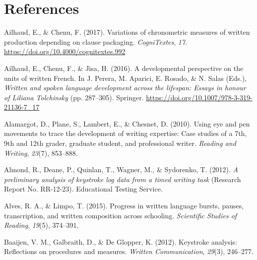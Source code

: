 \documentclass[
  man,floatsintext]{apa7}
\newlength{\cslhangindent}
\newlength{\cslentryspacingunit} %
\newenvironment{CSLReferences}[2] %
 {%
  \setlength{\parindent}{0pt}
  \ifodd #1
  \let\oldpar\par
  \def\par{\hangindent=\cslhangindent\oldpar}
  \fi
  \setlength{\parskip}{#2\cslentryspacingunit}
 }%
 {}
\begin{document}
\newpage

\hypertarget{references}{%
\section{References}\label{references}}

\begingroup

\setlength{\parindent}{-0.5in}

\setlength{\leftskip}{0.5in}

\hypertarget{references}{}

\endgroup

\newpage

\hypertarget{refs}{}
\begin{CSLReferences}{1}{0}
\leavevmode{}%
Ailhaud, E., \& Chenu, F. (2017). Variations of chronometric measures of written production depending on clause packaging. \emph{CogniTextes}, \emph{17}. \url{https://doi.org/10.4000/cognitextes.992}

\leavevmode{}%
Ailhaud, E., Chenu, F., \& Jisa, H. (2016). A developmental perspective on the units of written {F}rench. In J. Perera, M. Aparici, E. Rosado, \& N. Salas (Eds.), \emph{Written and spoken language development across the lifespan: Essays in honour of {Liliana Tolchinsky}} (pp. 287--305). Springer. \url{https://doi.org/10.1007/978-3-319-21136-7_17}

\leavevmode{}%
Alamargot, D., Plane, S., Lambert, E., \& Chesnet, D. (2010). Using eye and pen movements to trace the development of writing expertise: Case studies of a 7th, 9th and 12th grader, graduate student, and professional writer. \emph{Reading and Writing}, \emph{23}(7), 853--888.

\leavevmode{}%
Almond, R., Deane, P., Quinlan, T., Wagner, M., \& Sydorenko, T. (2012). \emph{A preliminary analysis of keystroke log data from a timed writing task} (Research Report No. RR-12-23). Educational Testing Service.

\leavevmode{}%
Alves, R. A., \& Limpo, T. (2015). Progress in written language bursts, pauses, transcription, and written composition across schooling. \emph{Scientific Studies of Reading}, \emph{19}(5), 374--391.

\leavevmode{}%
Baaijen, V. M., Galbraith, D., \& De Glopper, K. (2012). Keystroke analysis: Reflections on procedures and measures. \emph{Written Communication}, \emph{29}(3), 246--277.


\end{CSLReferences}
\end{document}
